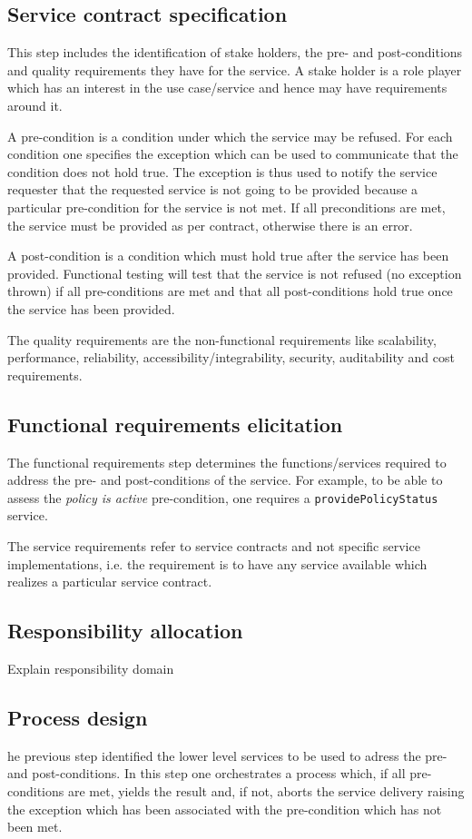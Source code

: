 \subsection{Service contract specification}
This step includes the identification of stake holders, the pre- and post-conditions and quality requirements they have for the service. A stake holder is a role player which has an interest in the use case/service and hence may have requirements around it. 

A pre-condition is a condition under which the service may be refused. For each condition one specifies the exception which can be used to communicate that the condition does not hold true. The exception is thus used to notify the service requester that the requested service is not going to be provided because a particular pre-condition for the service is not met. If all preconditions are met, the service must be provided as per contract, otherwise there is an error. 

A post-condition is a condition which must hold true after the service has been provided. Functional testing will test that the service is not refused (no exception thrown) if all pre-conditions are met and that all post-conditions hold true once the service has been provided.

The quality requirements are the non-functional requirements like scalability, performance, reliability, accessibility/integrability, security, auditability and cost requirements. 

\subsection{Functional requirements elicitation}
The functional requirements step determines the functions/services required to address the pre- and post-conditions of the service. For example, to be able to assess the {\em policy is active} pre-condition, one requires a \verb+providePolicyStatus+ service. 

The service requirements refer to service contracts and not specific service implementations, i.e. the requirement is to have any service available which realizes a particular service contract.

\subsection{Responsibility allocation}

Explain responsibility domain

\subsection{Process design}
he previous step identified the lower level services to be used to adress the pre- and post-conditions. In this step one orchestrates a process which, if all pre-conditions are met, yields the result and, if not, aborts the service delivery raising the exception which has been associated with the pre-condition which has not been met.







